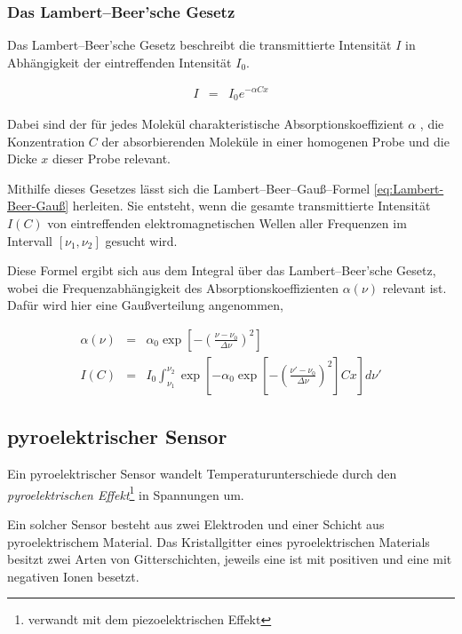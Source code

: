 \documentclass[12pt,a4paper]{scrartcl}
\numberwithin{equation}{section} %
\begin{document}
\hypertarget{das-lambertbeersche-gesetz}{\subsubsection{Das Lambert--Beer'sche Gesetz}\label{das-lambertbeersche-gesetz}}
Das Lambert--Beer'sche Gesetz beschreibt die transmittierte Intensität $I$ in Abhängigkeit der eintreffenden Intensität $I_0$. \cite{HakenWolf} %

\begin{eqnarray}
	I &=& I_0 e^{- \alpha C x} \label{eq:Lambert-Beer}
\end{eqnarray}

\noindent
Dabei sind der für jedes Molekül charakteristische Absorptionskoeffizient $\alpha$ , die Konzentration $C$ der absorbierenden Moleküle in einer homogenen Probe und die Dicke $x$ dieser Probe relevant.

Mithilfe dieses Gesetzes lässt sich die Lambert--Beer--Gauß--Formel \eqref{eq:Lambert-Beer-Gauß} herleiten. Sie entsteht, wenn die gesamte transmittierte Intensität $I(C)$ von eintreffenden elektromagnetischen Wellen aller Frequenzen im Intervall $[\nu_1, \nu_2]$ gesucht wird.

Diese Formel ergibt sich aus dem Integral über das Lambert--Beer'sche Gesetz, wobei die Frequenzabhängigkeit des Absorptionskoeffizienten $\alpha(\nu)$ relevant ist. Dafür wird hier eine Gaußverteilung angenommen,

\begin{eqnarray}
	\alpha(\nu) &=& \alpha_0 \exp[- \left(\frac{\nu - \nu_0}{\Delta \nu}\right)^2] \\
	I(C) &=& I_0 \int_{\nu_1}^{\nu_2} \exp[-\alpha_0 \exp \left[- \left(\frac{\nu' - \nu_0}{\Delta \nu}\right)^2\right] C x] d\nu' \label{eq:Lambert-Beer-Gauß}
\end{eqnarray}

\subsection{pyroelektrischer Sensor}
Ein pyroelektrischer Sensor wandelt Temperaturunterschiede durch den \emph{pyroelektrischen Effekt}\footnote{verwandt mit dem piezoelektrischen Effekt} in Spannungen um.

Ein solcher Sensor besteht aus zwei Elektroden und einer Schicht aus pyroelektrischem Material. Das Kristallgitter eines pyroelektrischen Materials besitzt zwei Arten von Gitterschichten, jeweils eine ist mit positiven und eine mit negativen Ionen besetzt. \cite{pyroelektrischer Sensor}
\end{document}
